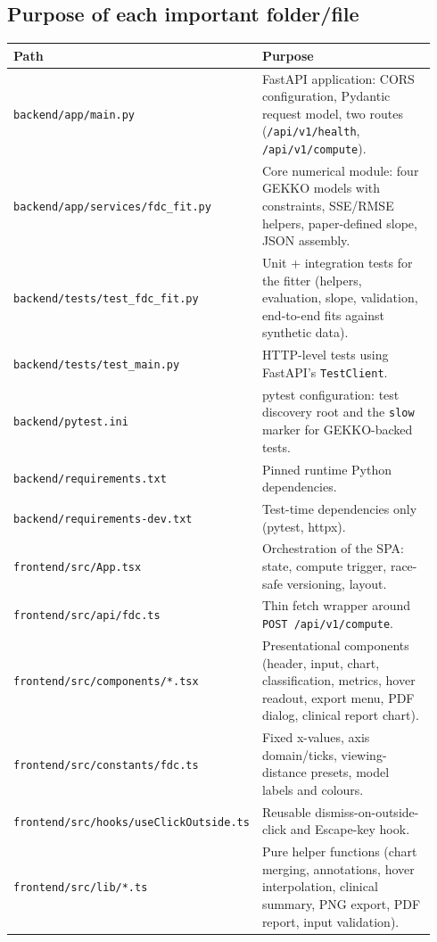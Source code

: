 \documentclass[11pt,a4paper]{article}
\begin{document}
\subsection{Purpose of each important folder/file}

\begin{longtable}{@{}p{0.36\linewidth} p{0.58\linewidth}@{}}
\toprule
\textbf{Path} & \textbf{Purpose} \\
\midrule
\texttt{backend/app/main.py} &
FastAPI application: CORS configuration, Pydantic request model, two routes
(\texttt{/api/v1/health}, \texttt{/api/v1/compute}). \\
\texttt{backend/app/services/fdc\_fit.py} &
Core numerical module: four GEKKO models with constraints, SSE/RMSE helpers,
paper-defined slope, JSON assembly. \\
\texttt{backend/tests/test\_fdc\_fit.py} &
Unit + integration tests for the fitter (helpers, evaluation, slope,
validation, end-to-end fits against synthetic data). \\
\texttt{backend/tests/test\_main.py} &
HTTP-level tests using FastAPI's \texttt{TestClient}. \\
\texttt{backend/pytest.ini} &
pytest configuration: test discovery root and the \texttt{slow} marker for
GEKKO-backed tests. \\
\texttt{backend/requirements.txt} &
Pinned runtime Python dependencies. \\
\texttt{backend/requirements-dev.txt} &
Test-time dependencies only (pytest, httpx). \\
\texttt{frontend/src/App.tsx} &
Orchestration of the SPA: state, compute trigger, race-safe versioning,
layout. \\
\texttt{frontend/src/api/fdc.ts} &
Thin fetch wrapper around \texttt{POST /api/v1/compute}. \\
\texttt{frontend/src/components/*.tsx} &
Presentational components (header, input, chart, classification, metrics,
hover readout, export menu, PDF dialog, clinical report chart). \\
\texttt{frontend/src/constants/fdc.ts} &
Fixed x-values, axis domain/ticks, viewing-distance presets, model labels
and colours. \\
\texttt{frontend/src/hooks/useClickOutside.ts} &
Reusable dismiss-on-outside-click and Escape-key hook. \\
\texttt{frontend/src/lib/*.ts} &
Pure helper functions (chart merging, annotations, hover interpolation,
clinical summary, PNG export, PDF report, input validation). \\

\end{longtable}
\end{document}
